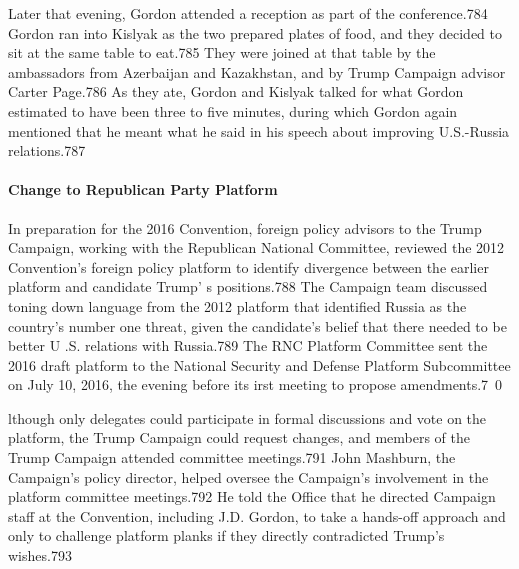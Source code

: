 Later that evening, Gordon attended a reception as part of the conference.784 Gordon ran into Kislyak as the two prepared plates of food, and they decided to sit at the same table to eat.785 They were joined at that table by the ambassadors from Azerbaijan and Kazakhstan, and by Trump Campaign advisor Carter Page.786 As they ate, Gordon and Kislyak talked for what Gordon estimated to have been three to five minutes, during which Gordon again mentioned that he meant what he said in his speech about improving U.S.-Russia relations.787

\paragraph{Change to Republican Party Platform}

In preparation for the 2016 Convention, foreign policy advisors to the Trump Campaign, working with the Republican National Committee, reviewed the 2012 Convention's foreign policy platform to identify divergence between the earlier platform and candidate Trump' s  positions.788 The Campaign team discussed toning down language from the 2012 platform that identified Russia as the country's  number one threat, given the candidate's belief that there needed to be better U .S. relations with Russia.789 The RNC Platform Committee sent the 2016 draft platform to the National Security and Defense Platform Subcommittee on July 10, 2016, the evening before its irst meeting to propose amendments.7~0

lthough only delegates could participate in formal discussions and vote on the platform, the Trump Campaign could request changes, and members of the Trump Campaign attended committee meetings.791 John Mashburn,  the Campaign's policy director, helped oversee the Campaign's involvement in the platform committee meetings.792 He told the Office that he directed Campaign staff at the Convention, including J.D. Gordon, to take a  hands-off approach and only to challenge platform planks if they directly contradicted Trump's  wishes.793


